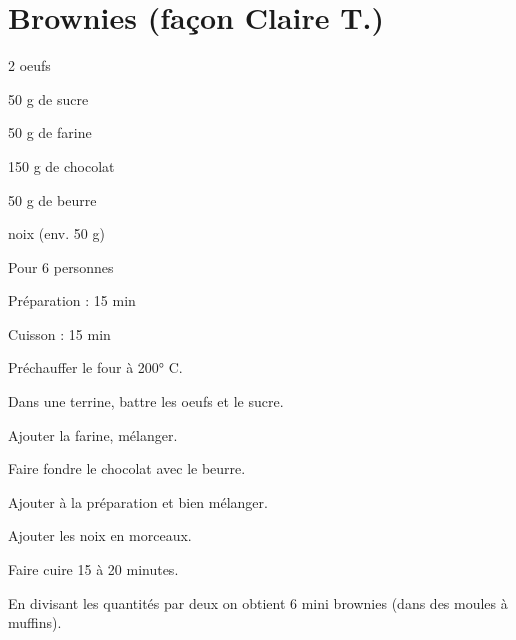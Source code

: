 \section[\normalsize{Brownies (façon Claire T.)}]{Brownies (façon Claire T.)}

\begin{ingredients}
\item 2 oeufs
\item 50 g de sucre
\item 50 g de farine
\item 150 g de chocolat
\item 50 g de beurre
\item noix (env. 50 g)
\end{ingredients}
\begin{infos}
\item Pour 6 personnes
\item Préparation : 15 min
\item Cuisson : 15 min
\end{infos}
\begin{etapes}
\item Pr\'echauffer le four \`a 200° C.
\item Dans une terrine, battre les oeufs et le sucre. 
\item Ajouter la farine, m\'elanger.
\item Faire fondre le chocolat avec le beurre. 
\item Ajouter \`a la pr\'eparation et bien m\'elanger.
\item Ajouter les noix en morceaux.
\item Faire cuire 15 \`a 20 minutes.
\end{etapes}
\begin{conseils}
En divisant les quantit\'es par deux on obtient 6 mini brownies (dans des moules \`a muffins).
\end{conseils}